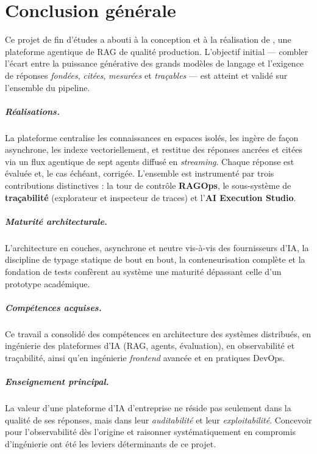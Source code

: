 \chapter*{Conclusion générale}

Ce projet de fin d'études a abouti à la conception et à la réalisation de
\devpilot{}, une plateforme agentique de RAG de qualité production. L'objectif
initial — combler l'écart entre la puissance générative des grands modèles de
langage et l'exigence de réponses \emph{fondées}, \emph{citées}, \emph{mesurées}
et \emph{traçables} — est atteint et validé sur l'ensemble du pipeline.

\paragraph{Réalisations.} La plateforme centralise les connaissances en espaces
isolés, les ingère de façon asynchrone, les indexe vectoriellement, et restitue
des réponses ancrées et citées via un flux agentique de sept agents diffusé en
\emph{streaming}. Chaque réponse est évaluée et, le cas échéant, corrigée.
L'ensemble est instrumenté par trois contributions distinctives : la tour de
contrôle \textbf{RAGOps}, le sous-système de \textbf{traçabilité} (explorateur et
inspecteur de traces) et l'\textbf{AI Execution Studio}.

\paragraph{Maturité architecturale.} L'architecture en couches, asynchrone et
neutre vis-à-vis des fournisseurs d'IA, la discipline de typage statique de bout
en bout, la conteneurisation complète et la fondation de tests confèrent au
système une maturité dépassant celle d'un prototype académique.

\paragraph{Compétences acquises.} Ce travail a consolidé des compétences en
architecture des systèmes distribués, en ingénierie des plateformes d'IA (RAG,
agents, évaluation), en observabilité et traçabilité, ainsi qu'en ingénierie
\emph{frontend} avancée et en pratiques DevOps.

\paragraph{Enseignement principal.} La valeur d'une plateforme d'IA d'entreprise
ne réside pas seulement dans la qualité de ses réponses, mais dans leur
\emph{auditabilité} et leur \emph{exploitabilité}. Concevoir pour l'observabilité
dès l'origine et raisonner systématiquement en compromis d'ingénierie ont été les
leviers déterminants de ce projet.


